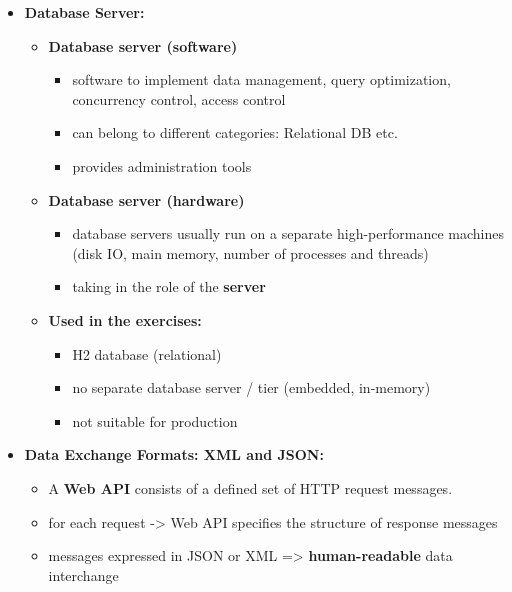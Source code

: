 \documentclass[ieeetran]{article}
\begin{document}
\begin{itemize}
\item \textbf{Database Server:}
	\begin{itemize}
	  \item \textbf{Database server (software)}
		  \begin{itemize}
		    \item software to implement data management, query optimization, concurrency control, access control
		\item can belong to different categories: Relational DB etc.
		\item provides administration tools
		  \end{itemize}

	\item \textbf{Database server (hardware)}
		\begin{itemize}
		  \item database servers usually run on a separate high-performance machines (disk IO, main memory, number of processes and threads)
		\item taking in the role of the \textbf{server}
		\end{itemize}

	\item \textbf{Used in the exercises:}
		\begin{itemize}
		  \item H2 database (relational)
		\item no separate database server / tier (embedded, in-memory)
		\item not suitable for production
		\end{itemize}
	\end{itemize}
\pagebreak
\item \textbf{Data Exchange Formats: XML and JSON:}
\begin{itemize}
  \item A \textbf{Web API} consists of a defined set of HTTP request messages.
\item for each request -> Web API specifies the structure of response messages
\item messages expressed in JSON or XML => \textbf{human-readable} data interchange
\end{itemize}
\end{itemize}
\end{document}
